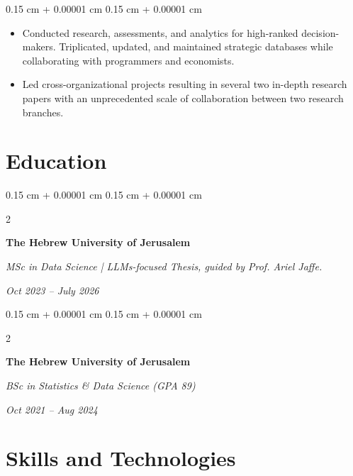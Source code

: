 \documentclass[10pt, letterpaper]{article}
\newenvironment{highlights}{
    \begin{itemize}[
        topsep=0.08 cm,
        parsep=0.08 cm,
        partopsep=0pt,
        itemsep=0pt,
        leftmargin=0.25 cm + 10pt
    ]
}{
    \end{itemize}
} %
\newenvironment{onecolentry}{
    \begin{adjustwidth}{
        0.15 cm + 0.00001 cm
    }{
        0.15 cm + 0.00001 cm
    }
}{
    \end{adjustwidth}
} %
\newenvironment{twocolentry}[2][]{
    \onecolentry
    \def\secondColumn{#2}
    \setcolumnwidth{\fill, 4.5 cm}
    \begin{paracol}{2}
}{
    \switchcolumn \raggedleft \secondColumn
    \end{paracol}
    \endonecolentry
} %
\begin{document}
        \vspace{0.08 cm}
        \begin{onecolentry}
            \begin{highlights}
                \item Conducted research, assessments, and analytics for high-ranked decision-makers. Triplicated, updated, and maintained strategic databases while collaborating with programmers and economists.
                \item Led cross-organizational projects resulting in several two in-depth research papers with an unprecedented scale of collaboration between two research branches.
            \end{highlights}
        \end{onecolentry}



    
    \section{Education}



        
        \begin{twocolentry}{
            
            
        \textit{Oct 2023 – July 2026}}
            \textbf{The Hebrew University of Jerusalem}

            \textit{MSc in Data Science | LLMs-focused Thesis, guided by Prof. Ariel Jaffe.}
        \end{twocolentry}



        \vspace{0.15 cm}

        \begin{twocolentry}{
            
            
        \textit{Oct 2021 – Aug 2024}}
            \textbf{The Hebrew University of Jerusalem}

            \textit{BSc in Statistics \& Data Science (GPA 89)}
        \end{twocolentry}




    
    \section{Skills and Technologies}
\end{document}
